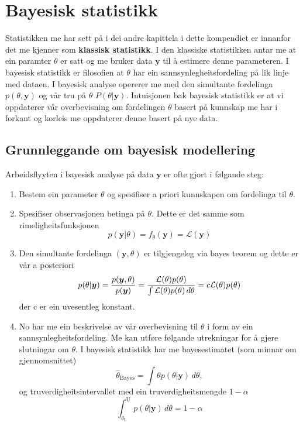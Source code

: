 \chapter{Bayesisk statistikk}

Statistikken me har sett på i dei andre kapittela i dette kompendiet er innanfor det me kjenner som \textbf{klassisk statistikk}. I den klassiske statistikken antar me at ein paramter $\theta$ er satt og me bruker data $\boldsymbol{y}$ til å estimere denne parameteren. I bayesisk statistikk er filosofien at $\theta$ har ein sannsynlegheitsfordeling på lik linje med dataen. I bayesisk analyse opererer me med den simultante fordelinga $p(\theta, \boldsymbol{y})$ og vår tru på $\theta$ $P(\theta | \boldsymbol{y})$. Intuisjonen bak bayesisk statistikk er at vi oppdaterer vår overbevisning om fordelingen $\theta$ basert på kunnskap me har i forkant og korleis me oppdaterer denne basert på nye data.

\section{Grunnleggande om bayesisk modellering}
Arbeidsflyyten i bayesisk analyse på data $\boldsymbol{y}$ er ofte gjort i følgande steg:

\begin{enumerate}

    \item Bestem ein parameter $\theta$ og spesifiser a priori kunnskapen om fordelinga til $\theta$.
    \item Spesifiser observasjonen betinga på $\theta$. Dette er det samme som rimeligheitsfunksjonen 
    \begin{equation}
        p(\boldsymbol{y} | \theta) = f_\theta(\boldsymbol{y}) = \mathcal{L}(\boldsymbol{y}) 
    \end{equation}
    \item Den simultante fordelinga $(\boldsymbol{y}, \theta)$ er tilgjengeleg via bayes teorem og dette er vår a posteriori
    \begin{equation}
        p(\theta|\boldsymbol{y}) = \frac{p(\boldsymbol{y}, \theta)}{p(\boldsymbol{y})} = \\
        \frac{\mathcal{L}(\theta)p(\theta)}{\int\mathcal{L}(\theta)p(\theta) \,d\theta} = c\mathcal{L}(\theta)p(\theta)
    \end{equation}
    der c er ein uvesentleg konstant.
    \item No har me ein beskrivelse av vår overbevisning til $\theta$ i form av ein sannsynlegheitsfordeling. Me kan utføre følgande utrekningar for å gjere slutningar om $\theta$. I bayesisk statistikk har me bayesestimatet (som minnar om gjennomsnittet)
    \begin{equation}
        \hat{\theta}_{\mathrm{Bayes}} = \int \theta p(\theta | \boldsymbol{y}) \,d\theta,
    \end{equation}
    og truverdigheitsintervallet med ein truverdigheitsmengde $1 - \alpha$
    \begin{equation}
        \int_{\theta_\mathrm{L}}^{\mathrm{U}} p(\theta | \boldsymbol{y}) \,d\theta = 1 - \alpha
    \end{equation}
\end{enumerate}